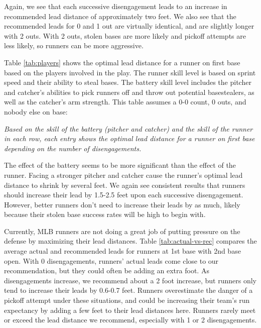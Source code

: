 \documentclass{article}
\begin{document}
      Again, we see that each successive disengagement leads to an increase in recommended lead distance of approximately two feet. We also see that the recommended leads for 0 and 1 out are virtually identical, and are slightly longer with 2 outs. With 2 outs, stolen bases are more likely and pickoff attempts are less likely, so runners can be more aggressive.

    
      Table \ref{tab:players} shows the optimal lead distance for a runner on first base based on the players involved in the play. The runner skill level is based on sprint speed and their ability to steal bases. The battery skill level includes the pitcher and catcher's abilities to pick runners off and throw out potential basestealers, as well as the catcher's arm strength. This table assumes a 0-0 count, 0 outs, and nobody else on base:
    
      \begin{table}
        \centering
        
        \caption{
          \it Based on the skill of the battery (pitcher and catcher) and the skill of the runner in each row, each entry shows the optimal lead distance for a runner on first base depending on the number of disengagements.
        }
        \label{tab:lead-by-players}
      \end{table}

      The effect of the battery seems to be more significant than the effect of the runner. Facing a stronger pitcher and catcher cause the runner's optimal lead distance to shrink by several feet. We again see consistent results that runners should increase their lead by 1.5-2.5 feet upon each successive disengagement. However, better runners don't need to increase their leads by as much, likely because their stolen base success rates will be high to begin with.

      Currently, MLB runners are not doing a great job of putting pressure on the defense by maximizing their lead distances. Table \ref{tab:actual-vs-rec} compares the average actual and recommended leads for runners at 1st base with 2nd base open. With 0 disengagements, runners' actual leads come close to our recommendation, but they could often be adding an extra foot. As disengagements increase, we recommend about a 2 foot increase, but runners only tend to increase their leads by 0.6-0.7 feet. Runners overestimate the danger of a pickoff attempt under these situations, and could be increasing their team's run expectancy by adding a few feet to their lead distances here. Runners rarely meet or exceed the lead distance we recommend, especially with 1 or 2 disengagements.
\end{document}
